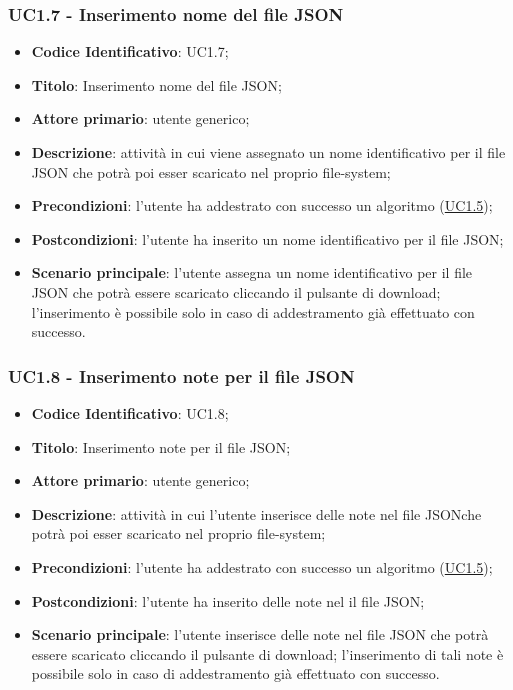 	\subsubsection{UC1.7 - Inserimento nome del file JSON}
		\begin{itemize}
			\item\textbf{Codice Identificativo}: UC1.7;
			\item\textbf{Titolo}: Inserimento nome del file JSON;
			\item\textbf{Attore primario}: utente generico;
			\item\textbf{Descrizione}: attività in cui viene assegnato un nome identificativo per il file JSON che potrà poi esser scaricato nel proprio file-system;
			\item\textbf{Precondizioni}: l'utente ha addestrato con successo un algoritmo (\hyperref[par:UC1.5]{UC1.5});
			\item\textbf{Postcondizioni}: l'utente ha inserito un nome identificativo per il file JSON;
			\item\textbf{Scenario principale}: l'utente assegna un nome identificativo per il file JSON che potrà essere scaricato cliccando il pulsante di download; l'inserimento è possibile solo in caso di addestramento già effettuato con successo. 	
			
			 	
		\end{itemize}
		
		\label{par:UC1.8}
	\subsubsection{UC1.8 - Inserimento note per il file JSON}
		\begin{itemize}
			\item\textbf{Codice Identificativo}: UC1.8;
			\item\textbf{Titolo}: Inserimento note per il file JSON;
			\item\textbf{Attore primario}: utente generico;
			\item\textbf{Descrizione}: attività in cui l'utente inserisce delle note nel file JSONche potrà poi esser scaricato nel proprio file-system;
			\item\textbf{Precondizioni}: l'utente ha addestrato con successo un algoritmo (\hyperref[par:UC1.5]{UC1.5});
			\item\textbf{Postcondizioni}: l'utente ha inserito delle note nel il file JSON;
			\item\textbf{Scenario principale}: l'utente inserisce delle note nel file JSON che potrà essere scaricato cliccando il pulsante di download; l'inserimento di tali note è possibile solo in caso di addestramento già effettuato con successo. 	
			
			
			 	
		\end{itemize}

